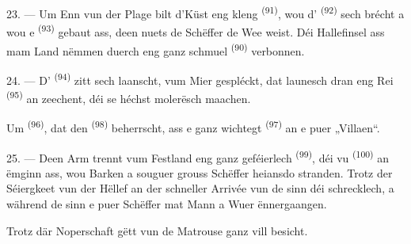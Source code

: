 23. --- Um Enn vun der Plage bilt d'Küst eng kleng 
 \textsuperscript{(91)}, wou d'
\textsuperscript{(92)} sech brécht a wou e  \textsuperscript{(93)}
gebaut ass, deen nuets de Schëffer de Wee weist. Déi Hallefinsel ass mam Land nëmmen
duerch eng ganz schmuel  \textsuperscript{(90)} verbonnen.

\VUsaut{3.0mm}
\VUsaut{3.0mm}

24. --- D' \textsuperscript{(94)} zitt sech laanscht, vum Mier
gespléckt, dat launesch dran eng Rei  \textsuperscript{(95)} an
 zeechent, déi se héchst molerësch maachen.

Um  \textsuperscript{(96)}, dat den 
\textsuperscript{(98)} beherrscht, ass e ganz wichtegt 
\textsuperscript{(97)} an e puer „Villaen“.

25. --- Deen Arm trennt vum Festland eng ganz geféierlech 
\textsuperscript{(99)}, déi vu  \textsuperscript{(100)} an
 ëmginn ass, wou Barken a souguer grouss Schëffer heiansdo
stranden. Trotz der Séiergkeet vun der Hëllef an der schneller Arrivée vun de
 sinn déi  schrecklech, a während de
 sinn e puer Schëffer mat Mann a Wuer ënnergaangen.

Trotz där Noperschaft gëtt  vun de Matrouse ganz vill besicht.

\VUsaut{6.0mm}
\VUfilet{22mm}

